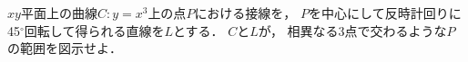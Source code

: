 \documentclass[../../main.tex]{subfiles}
\begin{document}
$xy$平面上の曲線$C:y=x^3$上の点$P$における接線を，
$P$を中心にして反時計回りに45$^\circ$回転して得られる直線を$L$とする．
$C$と$L$が，
相異なる3点で交わるような$P$の範囲を図示せよ．
\end{document}
